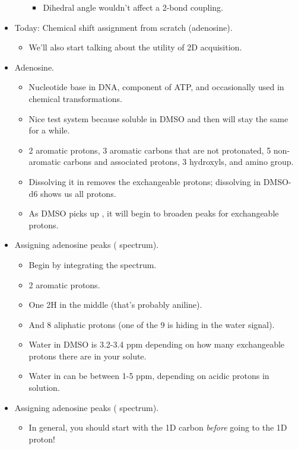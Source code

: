 \documentclass[../notes.tex]{subfiles}
\begin{document}
\begin{itemize}
\begin{itemize}
\begin{itemize}
            \item Dihedral angle wouldn't affect a 2-bond coupling.
        \end{itemize}
    \end{itemize}
    \item Today: Chemical shift assignment from scratch (adenosine).
    \begin{itemize}
        \item We'll also start talking about the utility of 2D acquisition.
    \end{itemize}
    \item Adenosine.
    \begin{itemize}
        \item Nucleotide base in DNA, component of ATP, and occasionally used in chemical transformations.
        \item Nice test system because soluble in DMSO and then will stay the same for a while.
        \item 2 aromatic protons, 3 aromatic carbons that are not protonated, 5 non-aromatic carbons and associated protons, 3 hydroxyls, and amino group.
        \item Dissolving it in  removes the exchangeable protons; dissolving in DMSO-d6 shows us all protons.
        \item As DMSO picks up , it will begin to broaden peaks for exchangeable protons.
    \end{itemize}
    \item Assigning adenosine peaks ( spectrum).
    \begin{itemize}
        \item Begin by integrating the spectrum.
        \item 2 aromatic protons.
        \item One 2H in the middle (that's probably aniline).
        \item And 8 aliphatic protons (one of the 9 is hiding in the water signal).
        \item Water in DMSO is 3.2-3.4 ppm depending on how many exchangeable protons there are in your solute.
        \item Water in  can be between 1-5 ppm, depending on acidic protons in solution.
    \end{itemize}
    \item Assigning adenosine peaks ( spectrum).
    \begin{itemize}
        \item In general, you should start with the 1D carbon \emph{before} going to the 1D proton!

\end{itemize}
\end{itemize}
\end{document}
